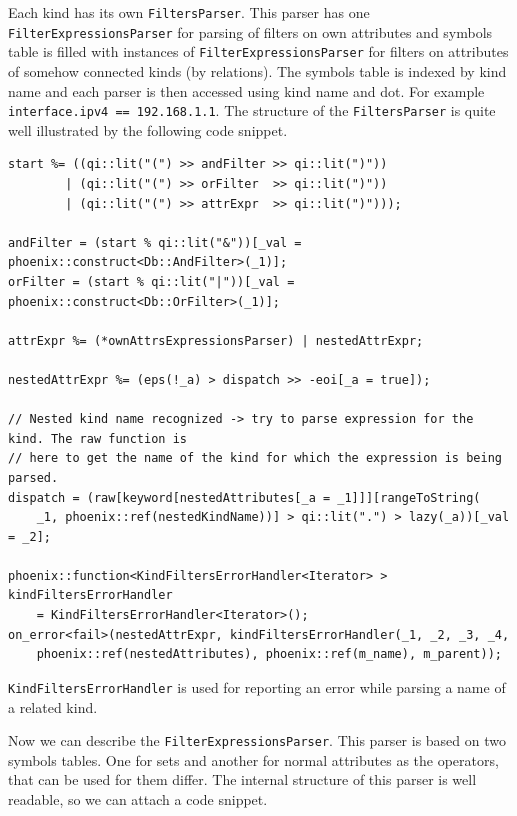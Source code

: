 \documentclass[deska]{subfiles}
\begin{document}
Each kind has its own {\tt FiltersParser}. This parser has one {\tt FilterExpressionsParser} for parsing of filters
on own attributes and symbols table is filled with instances of {\tt FilterExpressionsParser} for filters on attributes
of somehow connected kinds (by relations). The symbols table is indexed by kind name and each parser is then accessed
using kind name and dot. For example {\tt interface.ipv4 == 192.168.1.1}. The structure of the {\tt FiltersParser} is quite
well illustrated by the following code snippet.

\begin{verbatim}
start %= ((qi::lit("(") >> andFilter >> qi::lit(")"))
        | (qi::lit("(") >> orFilter  >> qi::lit(")"))
        | (qi::lit("(") >> attrExpr  >> qi::lit(")")));

andFilter = (start % qi::lit("&"))[_val = phoenix::construct<Db::AndFilter>(_1)];
orFilter = (start % qi::lit("|"))[_val = phoenix::construct<Db::OrFilter>(_1)];

attrExpr %= (*ownAttrsExpressionsParser) | nestedAttrExpr;

nestedAttrExpr %= (eps(!_a) > dispatch >> -eoi[_a = true]);

// Nested kind name recognized -> try to parse expression for the kind. The raw function is
// here to get the name of the kind for which the expression is being parsed.
dispatch = (raw[keyword[nestedAttributes[_a = _1]]][rangeToString(
    _1, phoenix::ref(nestedKindName))] > qi::lit(".") > lazy(_a))[_val = _2];

phoenix::function<KindFiltersErrorHandler<Iterator> > kindFiltersErrorHandler
    = KindFiltersErrorHandler<Iterator>();
on_error<fail>(nestedAttrExpr, kindFiltersErrorHandler(_1, _2, _3, _4,
    phoenix::ref(nestedAttributes), phoenix::ref(m_name), m_parent));
\end{verbatim}

{\tt KindFiltersErrorHandler} is used for reporting an error while parsing a name of a related kind.

Now we can describe the {\tt FilterExpressionsParser}. This parser is based on two symbols tables. One for sets and another
for normal attributes as the operators, that can be used for them differ. The internal structure of this parser is well
readable, so we can attach a code snippet.
\end{document}
